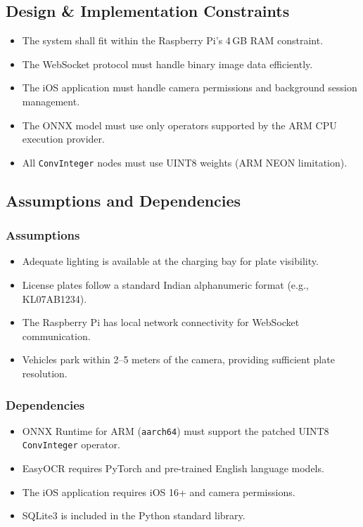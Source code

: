 \documentclass[11pt]{report}
\begin{document}
\subsection{Design \& Implementation Constraints}
\begin{itemize}
    \item The system shall fit within the Raspberry Pi's 4\,GB RAM constraint.
    \item The WebSocket protocol must handle binary image data efficiently.
    \item The iOS application must handle camera permissions and background session management.
    \item The ONNX model must use only operators supported by the ARM CPU execution provider.
    \item All \texttt{ConvInteger} nodes must use UINT8 weights (ARM NEON limitation).
\end{itemize}

\subsection{Assumptions and Dependencies}
\subsubsection{Assumptions}
\begin{itemize}
    \item Adequate lighting is available at the charging bay for plate visibility.
    \item License plates follow a standard Indian alphanumeric format (e.g., KL07AB1234).
    \item The Raspberry Pi has local network connectivity for WebSocket communication.
    \item Vehicles park within 2--5 meters of the camera, providing sufficient plate resolution.
\end{itemize}

\subsubsection{Dependencies}
\begin{itemize}
    \item ONNX Runtime for ARM (\texttt{aarch64}) must support the patched UINT8 \texttt{ConvInteger} operator.
    \item EasyOCR requires PyTorch and pre-trained English language models.
    \item The iOS application requires iOS 16+ and camera permissions.
    \item SQLite3 is included in the Python standard library.
\end{itemize}
\end{document}
